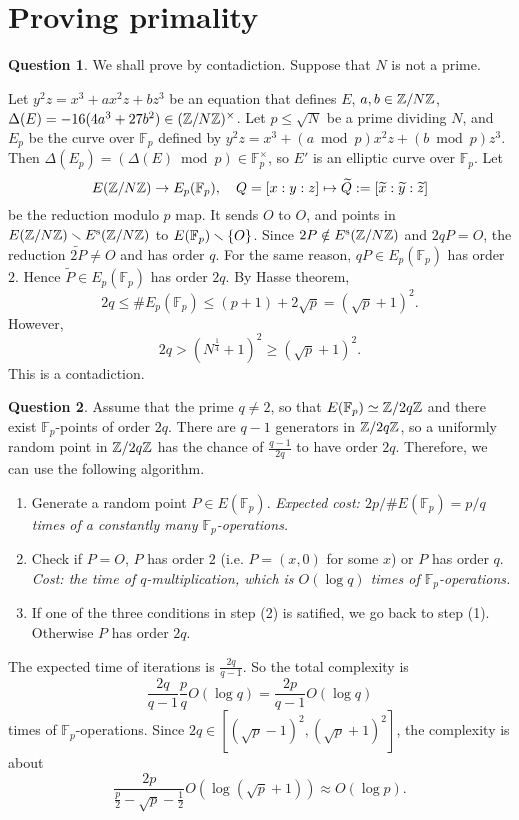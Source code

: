 \documentclass{article}
\newcommand{\F}{\mathbb{F}}
\newcommand{\s}{\mathrm{s}}
\theoremstyle{definition}
\newtheorem{question}{Question}[section]
\begin{document}
\section{Proving primality}
\begin{question}
    We shall prove by contadiction.
    Suppose that $N$ is not a prime.

    Let $y^2z = x^3  + ax^2z + bz^3$ be an equation that defines $E$, $a, b\in\mathbb{Z}/N\mathbb{Z}$,
    $\Delta(E) = -16(4a^3 + 27b^2) \in(\mathbb{Z}/N\mathbb{Z})^\times$.
    Let $p \le \sqrt{N}$ be a prime dividing $N$,
    and $E_p$ be the curve over $\F_p$ defined by
    $y^2z = x^3  + (a\bmod p)x^2z + (b\bmod p)z^3$.
    Then $\Delta(E_p) = (\Delta(E)\bmod p)\in\F_p^\times$,
    so $E'$ is an elliptic curve over $\F_p$.
    Let \[E(\Z/N\Z)\to E_p(\F_p),\quad Q = [x : y : z]\mapsto\tilde Q := [\tilde{x} : \tilde{y} : \tilde{z}]\]
    be the reduction modulo $p$ map.
    It sends $O$ to $O$, and points in $E(\Z/N\Z)\sminus E^\s(\Z/N\Z)$ to $E(\F_p)\sminus \{O\}$.
    Since $2P\notin E^\s(\Z/N\Z)$ and $2qP = O$,
    the reduction $\widetilde{2P}\neq O$ and has order $q$.
    For the same reason, $qP\in E_p(\F_p)$ has order $2$.
    Hence $\tilde{P}\in E_p(\F_p)$ has order $2q$.
    By Hasse theorem,
    \[2q\le \# E_p(\F_p) \le (p + 1) + 2\sqrt{p} = (\sqrt{p} + 1)^2.\]
    However,
    \[2q > (N^\frac{1}{4} + 1)^2\ge (\sqrt{p} + 1)^2.\]
    This is a contadiction.
\end{question}
\begin{question}
    Assume that the prime $q\ne 2$, so that $E(\F_p)\simeq \Z/2q\Z$ and there exist $\F_p$-points of order $2q$.
    There are $q - 1$ generators in $\mathbb{Z}/2q\mathbb{Z}$,
    so a uniformly random point in $\mathbb{Z}/2q\mathbb{Z}$ has the chance of $\frac{q-1}{2q}$ to have order $2q$.
    Therefore, we can use the following algorithm.\begin{enumerate}[(1)]
        \item Generate a random point $P\in E(\F_p)$. \textit{Expected cost: $2p/\# E(\F_p) = p/q$ times of a constantly many $\F_p$-operations.}
        \item Check if $P = O$, $P$ has order $2$ (i.e. $P = (x, 0)$ for some $x$) or $P$ has order $q$. \textit{Cost: the time of $q$-multiplication,
        which is $O(\log q)$ times of $\F_p$-operations.}
        \item If one of the three conditions in step (2) is satified, we go back to step (1).
        Otherwise $P$ has order $2q$.
    \end{enumerate}
    The expected time of iterations is $\frac{2q}{q-1}$. So the total complexity is \[\frac{2q}{q-1}\frac{p}{q} O(\log q) = \frac{2p}{q-1}O(\log q)\]
    times of $\F_p$-operations. Since $2q\in [(\sqrt{p} - 1) ^ 2, (\sqrt{p} + 1)^2]$,
    the complexity is about \[\frac{2p}{\frac{p}{2} - \sqrt{p} - \frac{1}{2}} O(\log(\sqrt{p} + 1))\approx O(\log p).\]
\end{question}
\end{document}

